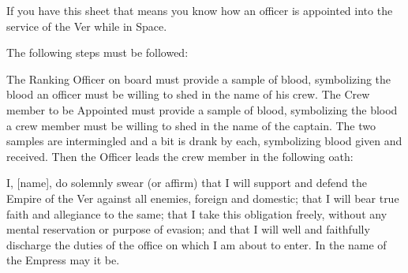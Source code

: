 \documentclass[green]{guildcamp4}
\begin{document}
\name{\gAppointing{}}

If you have this sheet that means you know how an officer is appointed into the service of the Ver while in Space. 

The following steps must be followed:

The Ranking Officer on board must provide a sample of blood, symbolizing the blood an officer must be willing to shed in the name of his crew.
The Crew member to be Appointed must provide a sample of blood, symbolizing the blood a crew member must be willing to shed in the name of the captain.
The two samples are intermingled and a bit is drank by each, symbolizing blood given and received.
Then the Officer leads the crew member in the following oath:

I, [name], do solemnly swear (or affirm) that I will support and defend the Empire of the Ver against all enemies, foreign and domestic; that I will bear true faith and allegiance to the same; that I take this obligation freely, without any mental reservation or purpose of evasion; and that I will well and faithfully discharge the duties of the office on which I am about to enter. In the name of the Empress may it be.
\end{document}
